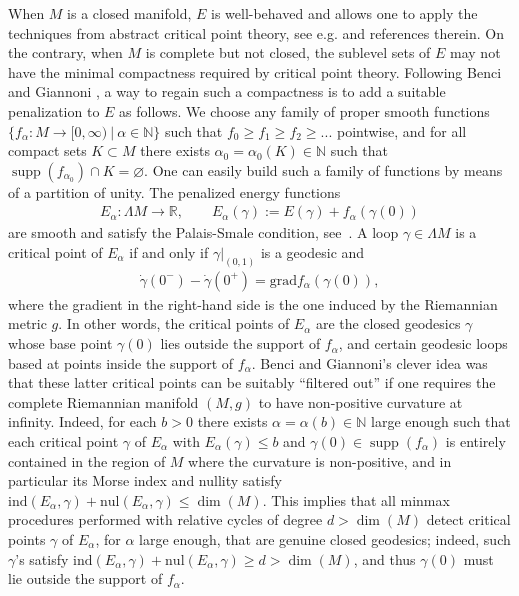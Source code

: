 \documentclass[reqno]{amsart}
\numberwithin{equation}{section}
\theoremstyle{personal}%
\theoremstyle{definition}
\newcommand{\N}{\mathds{N}}
\newcommand{\R}{\mathds{R}}
\newcommand{\ind}{\mathrm{ind}}
\newcommand{\nul}{\mathrm{nul}}
\DeclareMathOperator{\supp}{\mathrm{supp}}
\begin{document}
When $M$ is a closed manifold, $E$ is well-behaved and allows one to apply the techniques from abstract critical point theory, see e.g. \cite{Klingenberg:1978so} and references therein. On the contrary, when $M$ is complete but not closed, the sublevel sets of $E$ may not have the minimal compactness required by critical point theory. Following Benci and Giannoni \cite{Benci:1992lq}, a way to regain such a compactness is to add a suitable penalization to $E$ as follows. We choose any family of proper smooth functions $\{f_\alpha:M\to[0,\infty)\ |\ \alpha\in\N\}$ such that $f_0\geq f_1\geq f_2\geq ...$ pointwise, and for all compact sets $K\subset M$ there exists $\alpha_0=\alpha_0(K)\in\N$ such that 
$\supp(f_{\alpha_0})\cap K=\varnothing$. One can easily build such a family of functions by means of a partition of unity. The penalized energy functions
\begin{align*}
E_\alpha:\Lambda M\to\R,\qquad
E_\alpha(\gamma):=E(\gamma)+f_\alpha(\gamma(0))
\end{align*}
are smooth and satisfy the Palais-Smale condition, see~\cite[Lemma~4.5]{Benci:1992lq}. A loop $\gamma\in\Lambda M$ is a critical point of $E_\alpha$ if and only if $\gamma|_{(0,1)}$ is a geodesic and
\begin{align*}
 \dot\gamma(0^-)- \dot\gamma(0^+) = \mathrm{grad}f_\alpha(\gamma(0)),
\end{align*}
where the gradient in the right-hand side is the one induced by the Riemannian metric $g$. In other words, the critical points of $E_\alpha$ are the closed geodesics $\gamma$ whose base point $\gamma(0)$ lies outside the support of $f_\alpha$, and certain geodesic loops based at points inside the support of $f_\alpha$. Benci and Giannoni's clever idea was that these latter critical points can be suitably ``filtered out'' if one requires the complete Riemannian manifold $(M,g)$ to have non-positive curvature at infinity. Indeed, for each $b>0$ there exists $\alpha=\alpha(b)\in\N$ large enough such that each critical point $\gamma$ of $E_\alpha$ with $E_\alpha(\gamma)\leq b$ and $\gamma(0)\in\supp(f_\alpha)$ is entirely contained in the region of $M$ where the curvature is non-positive, and in particular its Morse index and nullity satisfy $\ind(E_\alpha,\gamma)+\nul(E_\alpha,\gamma)\leq\dim(M)$. This implies that all minmax procedures performed with relative cycles of degree $d>\dim(M)$ detect critical points $\gamma$ of $E_\alpha$, for $\alpha$ large enough, that are genuine closed geodesics; indeed, such $\gamma$'s satisfy $\ind(E_\alpha,\gamma)+\nul(E_\alpha,\gamma)\geq d>\dim(M)$, and  thus $\gamma(0)$ must lie outside the support of $f_\alpha$.
\end{document}
